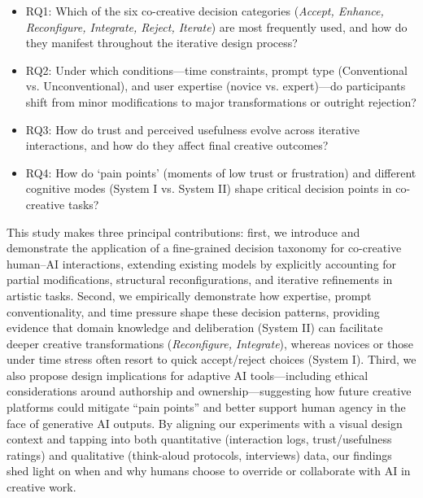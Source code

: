\documentclass[letterpaper]{article} %
\begin{document}
\begin{itemize}
    \item RQ1: Which of the six co-creative decision categories (\textit{Accept, Enhance, Reconfigure, Integrate, Reject, Iterate}) are most frequently used, and how do they manifest throughout the iterative design process?
   \item RQ2: Under which conditions—time constraints, prompt type (Conventional vs. Unconventional), and user expertise (novice vs. expert)—do participants shift from minor modifications to major transformations or outright rejection?
    \item RQ3: How do trust and perceived usefulness evolve across iterative interactions, and how do they affect final creative outcomes?
    \item RQ4: How do `pain points' (moments of low trust or frustration) and different cognitive modes (System I vs. System II) shape critical decision points in co-creative tasks?
\end{itemize}

This study makes three principal contributions: first, we introduce and demonstrate the application of a fine-grained decision taxonomy for co-creative human–AI interactions, extending existing models by explicitly accounting for partial modifications, structural reconfigurations, and iterative refinements in artistic tasks. Second, we empirically demonstrate how expertise, prompt conventionality, and time pressure shape these decision patterns, providing evidence that domain knowledge and deliberation (System II) can facilitate deeper creative transformations (\textit{Reconfigure, Integrate}), whereas novices or those under time stress often resort to quick accept/reject choices (System I). Third, we also propose design implications for adaptive AI tools—including ethical considerations around authorship and ownership—suggesting how future creative platforms could mitigate “pain points” and better support human agency in the face of generative AI outputs. By aligning our experiments with a visual design context and tapping into both quantitative (interaction logs, trust/usefulness ratings) and qualitative (think-aloud protocols, interviews) data, our findings shed light on when and why humans choose to override or collaborate with AI in creative work.
\end{document}
